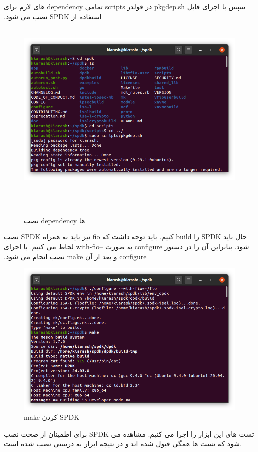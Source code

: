 ‫سپس با اجرای فایل pkgdep.sh در فولدر scripts تمامی dependency های لازم برای استفاده از SPDK نصب می شود.
‫
‫\begin{figure}[H]
‫    \centering
‫    \includegraphics[width=\textwidth]{figs/pkgdep.png}
‫    \caption{نصب dependency ها}
‫\end{figure}
‫
‫حال باید SPDK را build کنیم. باید توجه داشت که fio نیز باید به همراه SPDK نصب شود. بنابراین آن را در دستور configure به صورت  --with-fio لحاظ می کنیم. با اجرای configure و بعد از آن make نصب انجام می شود.
‫
\begin{figure}[H]
    \centering
    \includegraphics[width=\textwidth]{figs/configure.png}
    \caption{make کردن SPDK}
\end{figure}

برای اطمینان از صحت نصب SPDK تست های این ابزار را اجرا می کنیم. مشاهده می شود که تست ها همگی قبول شده اند و در نتیجه ابزار به درستی نصب شده است.

